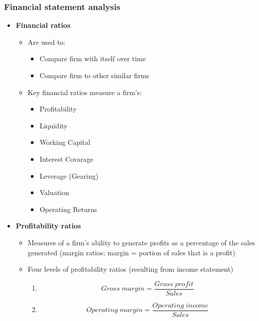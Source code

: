 \documentclass[ieeetran]{article}
\begin{document}
\subsubsection{Financial statement analysis} %
\label{ssub:}
\begin{itemize}
  \item \textbf{Financial ratios}
	  \begin{itemize}
	    \item Are used to:
		    \begin{itemize}
		      \item Compare firm with itself over time
		      \item Compare firm to other similar firms
		    \end{itemize}
	    \item Key financial ratios measure a firm's:
		    \begin{itemize}
		      \item Profitability
		      \item Liquidity
		      \item Working Capital
		      \item Interest Covarage
		      \item Leverage (Gearing)
		      \item Valuation
		      \item Operating Returns 
		    \end{itemize}
	  \end{itemize}

 \item \textbf{Profitability ratios}
	 \begin{itemize}
		 \item Measures of a firm's ability to generate profits as a percentage of the sales generated (margin ratios; margin = portion of sales that is a profit)
		\item Four levels of profitability ratios (resulting from income statement)
			\begin{enumerate}
			  \item 
			  \large
			  \begin{equation*}
			  \boxed{Gross \; margin = \frac{Gross \; profit}{Sales}}
			  \end{equation*}
			  \normalsize
			  
			  \item 
			  \large
			  \begin{equation*}
			  \boxed{Operating \; margin = \frac{Operating \; income}{Sales}}
			  \end{equation*}
			  \normalsize


\end{enumerate}
\end{itemize}
\end{itemize}
\end{document}
